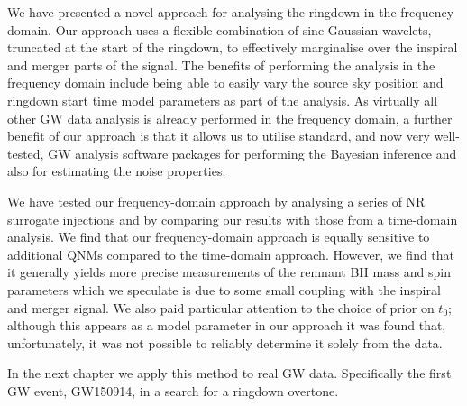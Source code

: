 We have presented a novel approach for analysing the ringdown in the frequency domain. 
Our approach uses a flexible combination of sine-Gaussian wavelets, truncated at the start of the ringdown, to effectively marginalise over the inspiral and merger parts of the signal. 
The benefits of performing the analysis in the frequency domain include being able to easily vary the source sky position and ringdown start time model parameters as part of the analysis.
As virtually all other GW data analysis is already performed in the frequency domain, a further benefit of our approach is that it allows us to utilise standard, and now very well-tested, GW analysis software packages for performing the Bayesian inference and also for estimating the noise properties.

We have tested our frequency-domain approach by analysing a series of NR surrogate injections and by comparing our results with those from a time-domain analysis. 
We find that our frequency-domain approach is equally sensitive to additional QNMs compared to the time-domain approach.
However, we find that it generally yields more precise measurements of the remnant BH mass and spin parameters which we speculate is due to some small coupling with the inspiral and merger signal.
We also paid particular attention to the choice of prior on $t_0$; although this appears as a model parameter in our approach it was found that, unfortunately, it was not possible to reliably determine it solely from the data.

In the next chapter we apply this method to real GW data.
Specifically the first GW event, GW150914, in a search for a ringdown overtone.